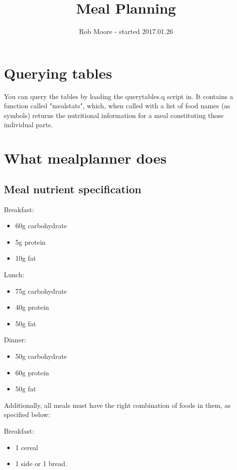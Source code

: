 \documentclass[a4paper]{article}
\title{Meal Planning}
\author{Rob Moore - started 2017.01.26}
\begin{document}
\maketitle

\section{Querying tables}

You can query the tables by loading the querytables.q script in. It contains
a function called "mealstats", which, when called with a list of food names
(as symbols) returns the nutritional information for a meal constituting
those individual parts.

\section{What mealplanner does}

\subsection{Meal nutrient specification}

Breakfast:
\begin{itemize}
  \item 60g carbohydrate
  \item 5g protein
  \item 10g fat
\end{itemize}

Lunch:
\begin{itemize}
  \item 75g carbohydrate
  \item 40g protein
  \item 50g fat
\end{itemize}

Dinner:
\begin{itemize}
  \item 50g carbohydrate
  \item 60g protein
  \item 50g fat
\end{itemize}

Additionally, all meals must have the right combination of foods in them, as 
specified below:

Breakfast:
\begin{itemize}
  \item 1 cereal 
  \item 1 side or 1 bread.
\end{itemize}
\end{document}
